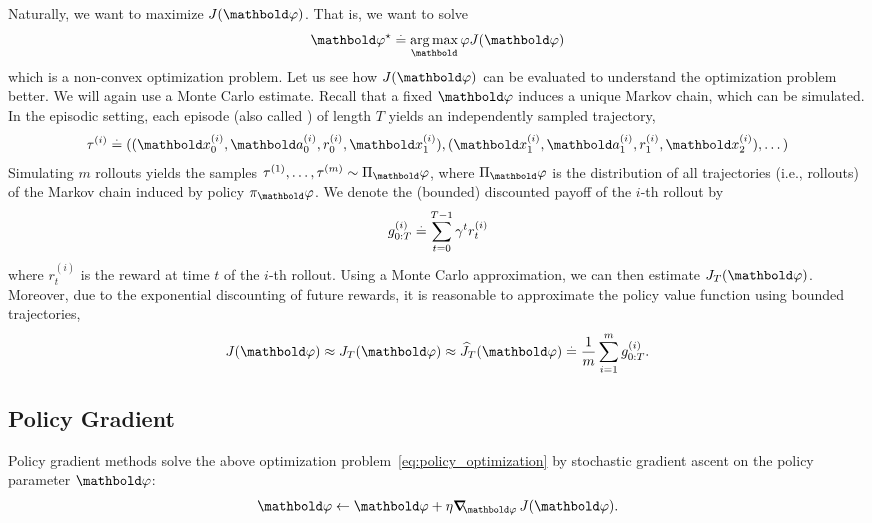Naturally, we want to maximize $\j{\vvarphi}$. That is, we want to solve \begin{align}
  \opt{\vvarphi} \defeq \argmax_\vvarphi \j{\vvarphi} \label{eq:policy_optimization}
\end{align} which is a non-convex optimization problem.
Let us see how $\j{\vvarphi}$ can be evaluated to understand the optimization problem better.
We will again use a Monte Carlo estimate.
Recall that a fixed $\vvarphi$ induces a unique Markov chain, which can be simulated.
In the episodic setting, each episode (also called ) of length $T$ yields an independently sampled trajectory, \begin{align}
  \tau^{(i)} \defeq ((\vx_0^{(i)}, \va_0^{(i)}, r_0^{(i)}, \vx_1^{(i)}), (\vx_1^{(i)}, \va_1^{(i)}, r_1^{(i)}, \vx_2^{(i)}), \dots)
\end{align}
Simulating $m$ rollouts yields the samples $\tau^{(1)}, \dots, \tau^{(m)} \sim \altpi_\vvarphi$, where $\altpi_\vvarphi$ is the distribution of all trajectories (i.e., rollouts) of the Markov chain induced by policy $\pi_\vvarphi$.
We denote the (bounded) discounted payoff of the $i$-th rollout by \begin{align}
  g_{0:T}^{(i)} \overset{.}{=} \sum_{t=0}^{T-1} \gamma^t r_t^{(i)} \label{eq:bounded_discounted_reward_sample}
\end{align} where $r_t^{(i)}$ is the reward at time $t$ of the $i$-th rollout.
Using a Monte Carlo approximation, we can then estimate $\j{\vvarphi}[T]$.
Moreover, due to the exponential discounting of future rewards, it is reasonable to approximate the policy value function using bounded trajectories, \begin{align}
  \j{\vvarphi} \approx \j{\vvarphi}[T] \approx \J{\vvarphi}[T] \defeq \frac{1}{m} \sum_{i=1}^m g_{0:T}^{(i)}.
\end{align}

\subsection{Policy Gradient}\label{sec:mfarl:policy_approximation:reinforce}

Policy gradient methods solve the above optimization problem~\eqref{eq:policy_optimization} by stochastic gradient ascent on the policy parameter $\vvarphi$: \begin{align}
  \vvarphi \gets \vvarphi + \eta \grad_\vvarphi \j{\vvarphi}. \label{eq:policy_gradient_ascent}
\end{align}

